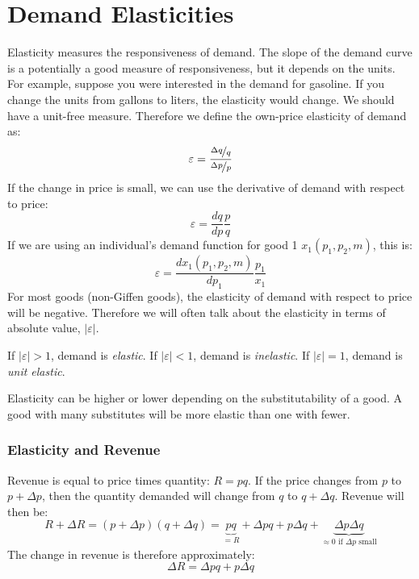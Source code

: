 \documentclass{article}
\begin{document}
\section{Demand Elasticities}
Elasticity measures the responsiveness of demand. The slope of the demand curve is a potentially a good measure of responsiveness, but it depends on the units. For example, suppose you were interested in the demand for gasoline. If you change the units from gallons to liters, the elasticity would change. We should have a unit-free measure. Therefore we define the own-price elasticity of demand as:
\[
  \varepsilon = \frac{\nicefrac{\Delta q}{q}}{\nicefrac{\Delta p }{p}}
\]
If the change in price is small, we can use the derivative of demand with respect to price:
\[
  \varepsilon = \frac{dq}{dp}\frac{p}{q}
\]
If we are using an individual's demand function for good 1 $x_1\left( p_1,p_2,m \right)$, this is:
\[
  \varepsilon = \frac{dx_1\left( p_1,p_2,m \right)}{dp_1}\frac{p_1}{x_1}
\]
For most goods (non-Giffen goods), the elasticity of demand with respect to price will be negative. Therefore we will often talk about the elasticity in terms of absolute value, $\left| \varepsilon \right|$.

If $\left| \varepsilon \right|>1$, demand is \emph{elastic}. If $\left| \varepsilon \right|<1$, demand is \emph{inelastic}. If $\left| \varepsilon \right|=1$, demand is \emph{unit elastic}.

Elasticity can be higher or lower depending on the substitutability of a good. A good with many substitutes will be more elastic than one with fewer.
\subsubsection*{Elasticity and Revenue}
Revenue is equal to price times quantity: $R=pq$. If the price changes from $p$ to $p+\Delta p$, then the quantity demanded will change from $q$ to $q+\Delta q$. Revenue will then be:
\[
  R+\Delta R= \left( p+\Delta p \right)\left( q + \Delta q \right)=\underbrace{pq}_{=R} + \Delta p q + p\Delta q + \underbrace{\Delta p \Delta q}_{\approx 0 \text{ if } \Delta p \text{ small}}
\]
The change in revenue is therefore approximately:
\[
  \Delta R = \Delta p q + p\Delta q
\]
\end{document}
